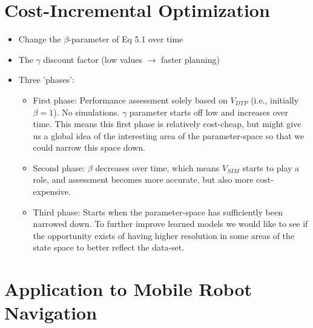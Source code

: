 

\section{Cost-Incremental Optimization}
\label{sec:cost-effective-optimization}

\begin{itemize}
	\item Change the $\beta$-parameter of Eq 5.1 over time
	\item The $\gamma$ discount factor (low values $\to$ faster planning)
	\item Three 'phases':
	\begin{itemize}
		\item First phase: Performance assessment solely based on $V_\mathit{DTP}$ (i.e., initially $\beta = 1$). No simulations. $\gamma$ parameter starts off low and increases over time. This means this first phase is relatively cost-cheap, but might give us a global idea of the interesting area of the parameter-space so that we could narrow this space down.
		\item Second phase: $\beta$ decreases over time, which means $V_\mathit{SIM}$ starts to play a role, and assessment becomes more accurate, but also more cost-expensive.
		\item Third phase: Starts when the parameter-space has sufficiently been narrowed down. To further improve learned models we would like to see if the opportunity exists of having higher resolution in some areas of the state space to better reflect the data-set.
	\end{itemize}
\end{itemize}

\newpage

\section{Application to Mobile Robot Navigation}
\label{sec:application-mobile-robot}

